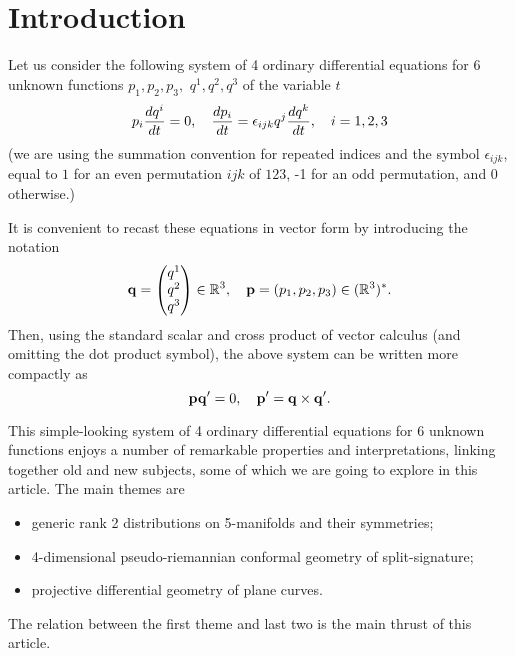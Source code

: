 







\section{Introduction} Let us consider the following system of 4
ordinary differential equations for 6 unknown functions $p_1,
p_2,p_3,$ $q^1,q^2,q^3$ of the variable $t$ 
$$ p_i
{dq^i\over dt}=0, \quad {dp_i\over dt}=\epsilon_{ijk}q^j{dq^k\over
dt},\quad i=1,2,3$$
 (we are using the summation
convention for repeated indices and the  symbol $\epsilon_{ijk}$, equal to $1$ for an even
permutation $ijk$ of $123$, -1 for an odd permutation, and 0
otherwise.)



It is convenient to recast these equations in  vector form by
introducing the notation
 $$\mathbf q=\left(\begin{matrix}q^1\\ q^2\\ q^3\end{matrix}\right)\in\mathbb{R}^3,\quad
{\mathbf p}=(p_1, p_2, p_3)\in(\mathbb{R}^3)^*.$$
Then, using the standard scalar and cross product
of vector calculus (and omitting the dot product symbol), the above
system can be written more compactly as
\begin{equation}\label{eqns} 
{\mathbf p}\mathbf q'=0, \quad {\mathbf p}'=\mathbf q\times \mathbf q'.
\end{equation}




This simple-looking  system of 4 ordinary differential equations for 6 unknown functions  enjoys a number of remarkable  properties and
interpretations, linking together old and new subjects, some of which we are going to explore in this article. The main themes  are 
\begin{itemize}
\item  generic  rank 2 distributions on 5-manifolds and their symmetries;
\item  4-dimensional pseudo-riemannian conformal geometry of split-signature;

\item  projective differential  geometry of plane curves. \end{itemize}
The relation between the first theme   and last  two is the main thrust  of this article. 


